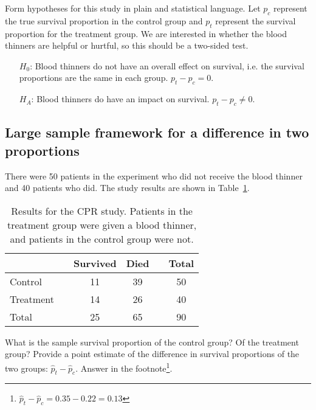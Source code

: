 \begin{example}{Form hypotheses for this study in plain and statistical language. Let $p_c$ represent the true survival proportion in the control group and $p_t$ represent the survival proportion for the treatment group.} \label{hypothesesForCPRStudyInSmallSampleSection}
We are interested in whether the blood thinners are helpful or hurtful, so this should be a two-sided test.
\begin{itemize}
\item[$H_0$:] Blood thinners do not have an overall effect on survival, i.e. the survival proportions are the same in each group. $p_t - p_c = 0$.
\item[$H_A$:] Blood thinners do have an impact on survival. $p_t - p_c \neq 0$.
\end{itemize}
\end{example}

\subsection{Large sample framework for a difference in two proportions}

There were 50 patients in the experiment who did not receive the blood thinner and 40 patients who did. The study results are shown in Table~\ref{resultsForCPRStudyInSmallSampleSection}.

\begin{table}[ht]
\centering
\begin{tabular}{lccccc}
\hline
			&& Survived 	& Died 	&& Total \\
\hline
Control		&& 11		& 39		&& 50 \\
Treatment		&& 14		& 26		&& 40 \\
\hline
Total			&& 25		& 65		&& 90 \\
\hline
\end{tabular}
\caption{Results for the CPR study. Patients in the treatment group were given a blood thinner, and patients in the control group were not.}
\label{resultsForCPRStudyInSmallSampleSection}
\end{table}

\begin{exercise}
What is the sample survival proportion of the control group? Of the treatment group? Provide a point estimate of the difference in survival proportions of the two groups: $\hat{p}_t - \hat{p}_c$. Answer in the footnote\footnote{$\hat{p}_t - \hat{p}_c = 0.35 - 0.22 = 0.13$}.
\end{exercise}

